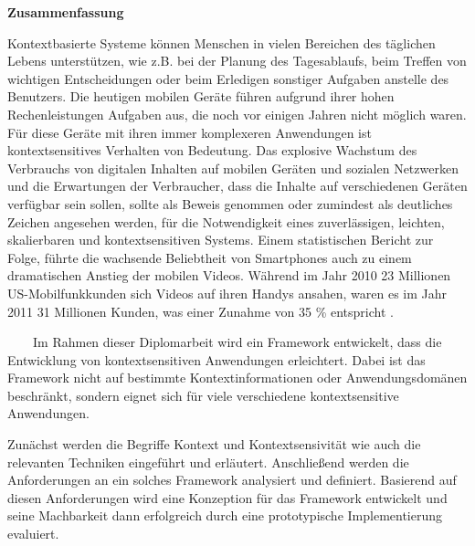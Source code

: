 \thispagestyle{empty}
\vspace*{0.2cm}

\begin{center}
    \textbf{Zusammenfassung}
\end{center}

\vspace*{0.2cm}

\noindent 
Kontextbasierte Systeme k\"onnen Menschen in vielen Bereichen des t\"aglichen Lebens unterst\"utzen, wie z.B. bei der Planung des Tagesablaufs, beim Treffen von wichtigen Entscheidungen oder beim Erledigen sonstiger Aufgaben anstelle des Benutzers. Die heutigen mobilen Ger\"ate f\"uhren aufgrund ihrer hohen Rechenleistungen Aufgaben aus, die noch vor einigen Jahren nicht m\"oglich waren. F\"ur diese Ger\"ate mit ihren immer komplexeren Anwendungen ist kontextsensitives Verhalten von Bedeutung. Das explosive Wachstum des Verbrauchs von digitalen Inhalten auf mobilen Geräten und sozialen Netzwerken und die Erwartungen der Verbraucher, dass die Inhalte auf verschiedenen Ger\"aten verf\"ugbar sein sollen, sollte als Beweis genommen oder zumindest als deutliches Zeichen angesehen werden, für die Notwendigkeit eines zuverl\"assigen, leichten, skalierbaren und kontextsensitiven Systems. Einem statistischen Bericht zur Folge, führte die wachsende Beliebtheit von Smartphones auch zu einem dramatischen Anstieg der mobilen Videos. W\"ahrend im Jahr 2010 23 Millionen US-Mobilfunkkunden sich Videos auf ihren Handys ansahen, waren es im Jahr 2011 31 Millionen Kunden, was einer Zunahme von 35 \% entspricht \cite{mobile-media-report}.

\ \
\ \
Im Rahmen dieser Diplomarbeit wird ein Framework entwickelt, dass die Entwicklung von kontextsensitiven Anwendungen erleichtert. Dabei ist das Framework nicht auf bestimmte Kontextinformationen oder Anwendungsdom\"anen beschr\"ankt, sondern eignet sich für viele verschiedene kontextsensitive Anwendungen.

Zun\"achst werden die Begriffe Kontext und Kontextsensivit\"at wie auch die relevanten Techniken eingef\"uhrt und erl\"autert. Anschlie{\ss}end werden die Anforderungen an ein solches Framework analysiert und definiert. Basierend auf diesen Anforderungen wird eine Konzeption für das Framework entwickelt und seine Machbarkeit dann erfolgreich durch eine prototypische Implementierung evaluiert.


